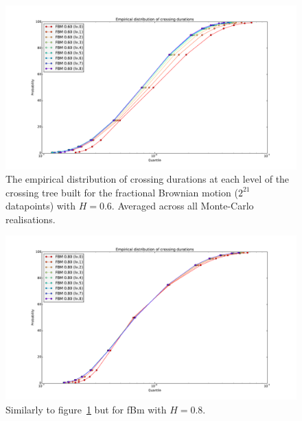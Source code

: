 \documentclass[a4paper]{article}
\begin{document}
\begin{figure}[htb]\begin{center}
    \includegraphics[width=6in]{images/fig_09_med_FBM_060}
    \caption{The empirical distribution of crossing durations at each level of the
    crossing tree built for the fractional Brownian motion ($2^{21}$ datapoints) with $H = 0.6$.
    Averaged across all Monte-Carlo realisations.}
\label{fig:fbm_quantiles_06}
\end{center}\end{figure}

\begin{figure}[htb]\begin{center}
    \includegraphics[width=6in]{images/fig_09_med_FBM_080}
    \caption{Similarly to figure~\ref{fig:fbm_quantiles_06} but for fBm with $H=0.8$.}
\label{fig:fbm_quantiles_08}
\end{center}\end{figure}
\end{document}
